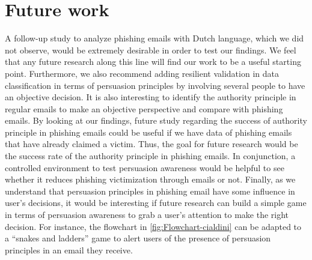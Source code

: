 \section{\label{sec:Future-work}Future work}

A follow-up study to analyze phishing emails with Dutch language,
which we did not observe, would be extremely desirable in order to
test our findings. We feel that any future research along this line
will find our work to be a useful starting point. Furthermore, we
also recommend adding resilient validation in data classification
in terms of persuasion principles by involving several people to have
an objective decision. It is also interesting to identify the authority
principle in regular emails to make an objective perspective and compare
with phishing emails. By looking at our findings, future study regarding
the success of authority principle in phishing emails could be useful
if we have data of phishing emails that have already claimed a victim.
Thus, the goal for future research would be the success rate of the
authority principle in phishing emails. In conjunction, a controlled
environment to test persuasion awareness would be helpful to see whether
it reduces phishing victimization through emails or not. Finally,
as we understand that persuasion principles in phishing email have
some influence in user\textquoteright s decisions, it would be interesting
if future research can build a simple game in terms of persuasion
awareness to grab a user\textquoteright s attention to make the right
decision. For instance, the flowchart in \autoref{fig:Flowchart-cialdini}
can be adapted to a \textquotedblleft snakes and ladders\textquotedblright{}
game to alert users of the presence of persuasion principles in an
email they receive.%

